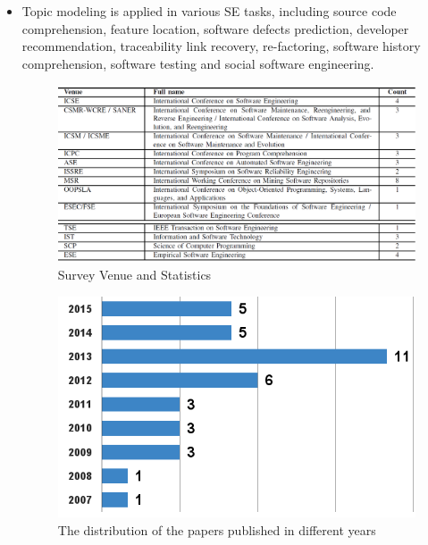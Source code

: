 \documentclass[conference]{IEEEtran}
\theoremstyle{break}
\begin{document}
\begin{itemize}
    \item Topic modeling is applied in various SE tasks, including source code comprehension, feature location, software defects prediction, developer recommendation, traceability link recovery, re-factoring, software history comprehension, software testing and social software engineering.

\begin{figure}[!htpb]
  \captionsetup{justification=centering}
  \includegraphics[width=\linewidth]{./fig/venues.png}
  \caption{Survey Venue and Statistics}
  \label{fig: venues}
\end{figure}

\begin{figure}[!htpb]
  \captionsetup{justification=centering}
  \includegraphics[width=\linewidth]{./fig/survey.png}
  \caption{The distribution of the papers published in different years}
  \label{fig: survey}
\end{figure}


\end{itemize}
\end{document}
